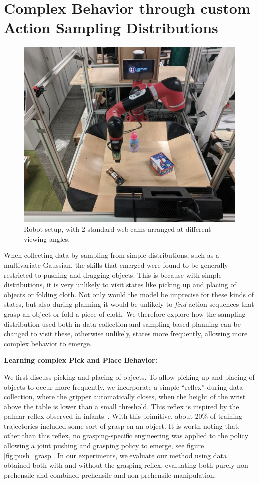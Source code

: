 \section{Complex Behavior through custom Action Sampling Distributions}
\begin{figure}
	\centering
	\includegraphics[width=0.7\linewidth]{images_general/robot_setup.jpg}
	\caption{\small{Robot setup, with 2 standard web-cams arranged at different viewing angles. }
		\label{fig:robot_setup}
	}
\end{figure}
\label{sec:system}
When collecting data by sampling from simple distributions, such as a multivariate Gaussian, the skills that emerged were found to be generally restricted to pushing and dragging objects. This is because with simple distributions, it is very unlikely to visit states like picking up and placing of objects or folding cloth. Not only would the model be imprecise for these kinds of states, but also during planning it would be unlikely to \emph{find} action sequences that grasp an object or fold a piece of cloth. 
We therefore explore how the sampling distribution used both in data collection and sampling-based planning can be changed to visit these, otherwise unlikely, states more frequently, allowing more complex behavior to emerge. 

\noindent \textbf{Learning complex Pick and Place Behavior:}

We first discuss picking and placing of objects. To allow picking up and placing of objects to occur more frequently, we incorporate a simple ``reflex'' during data collection, where the gripper automatically closes, when the height of the wrist above the table is lower than a small threshold. This reflex is inspired by the palmar reflex observed in infants~\cite{grasping_fetal}. With this primitive, about 20\% of training trajectories included some sort of grasp on an object. It is worth noting that, other than this reflex, no grasping-specific engineering was applied to the policy allowing a joint pushing and grasping policy to emerge, see figure \ref{fig:push_grasp}. In our experiments, we evaluate our method using data obtained both with and without the grasping reflex, evaluating both purely non-prehensile and combined prehensile and non-prehensile manipulation.


